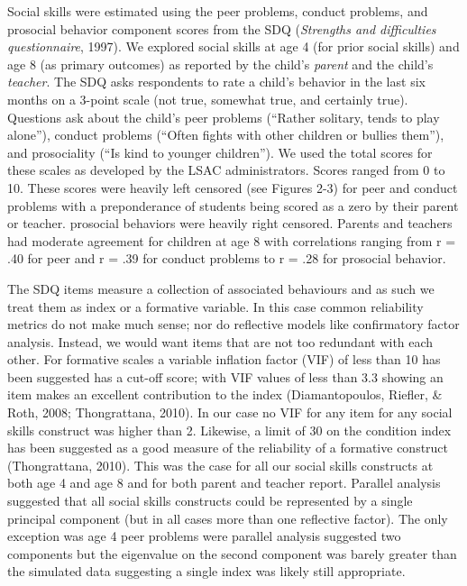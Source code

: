 \documentclass[
  english,
  man]{apa6}
\begin{document}
Social skills were estimated using the peer problems, conduct problems, and prosocial behavior component scores from the SDQ (\emph{Strengths and difficulties questionnaire}, 1997). We explored social skills at age 4 (for prior social skills) and age 8 (as primary outcomes) as reported by the child's \emph{parent} and the child's \emph{teacher}. The SDQ asks respondents to rate a child's behavior in the last six months on a 3-point scale (not true, somewhat true, and certainly true). Questions ask about the child's peer problems (``Rather solitary, tends to play alone''), conduct problems (``Often fights with other children or bullies them''), and prosociality (``Is kind to younger children''). We used the total scores for these scales as developed by the LSAC administrators. Scores ranged from 0 to 10. These scores were heavily left censored (see Figures 2-3) for peer and conduct problems with a preponderance of students being scored as a zero by their parent or teacher. prosocial behaviors were heavily right censored. Parents and teachers had moderate agreement for children at age 8 with correlations ranging from r = .40 for peer and r = .39 for conduct problems to r = .28 for prosocial behavior.

The SDQ items measure a collection of associated behaviours and as such we treat them as index or a formative variable. In this case common reliability metrics do not make much sense; nor do reflective models like confirmatory factor analysis. Instead, we would want items that are not too redundant with each other. For formative scales a variable inflation factor (VIF) of less than 10 has been suggested has a cut-off score; with VIF values of less than 3.3 showing an item makes an excellent contribution to the index (Diamantopoulos, Riefler, \& Roth, 2008; Thongrattana, 2010). In our case no VIF for any item for any social skills construct was higher than 2. Likewise, a limit of 30 on the condition index has been suggested as a good measure of the reliability of a formative construct (Thongrattana, 2010). This was the case for all our social skills constructs at both age 4 and age 8 and for both parent and teacher report. Parallel analysis suggested that all social skills constructs could be represented by a single principal component (but in all cases more than one reflective factor). The only exception was age 4 peer problems were parallel analysis suggested two components but the eigenvalue on the second component was barely greater than the simulated data suggesting a single index was likely still appropriate.
\end{document}
